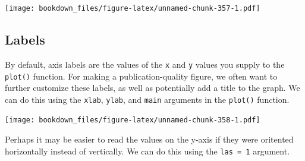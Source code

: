 \documentclass[
]{krantz}
\makeatletter
\newenvironment{Shaded}{\begin{snugshade}}{\end{snugshade}}
\newcommand{\DataTypeTok}[1]{\textcolor[rgb]{0.27,0.27,0.27}{#1}}
\newcommand{\DecValTok}[1]{\textcolor[rgb]{0.06,0.06,0.06}{#1}}
\newcommand{\KeywordTok}[1]{\textcolor[rgb]{0.27,0.27,0.27}{\textbf{#1}}}
\newcommand{\NormalTok}[1]{#1}
\newcommand{\OperatorTok}[1]{\textcolor[rgb]{0.43,0.43,0.43}{\textbf{#1}}}
\newcommand{\StringTok}[1]{\textcolor[rgb]{0.5,0.5,0.5}{#1}}
\newenvironment{kframe}{%
\medskip{}
\setlength{\fboxsep}{.8em}
 \def\at@end@of@kframe{}%
 \ifinner\ifhmode%
  \def\at@end@of@kframe{\end{minipage}}%
  \begin{minipage}{\columnwidth}%
 \fi\fi%
 \def\FrameCommand##1{\hskip\@totalleftmargin \hskip-\fboxsep
 \colorbox{shadecolor}{##1}\hskip-\fboxsep
     \hskip-\linewidth \hskip-\@totalleftmargin \hskip\columnwidth}%
 \MakeFramed {\advance\hsize-\width
   \@totalleftmargin\z@ \linewidth\hsize
   \@setminipage}}%
 {\par\unskip\endMakeFramed%
 \at@end@of@kframe}
\renewenvironment{Shaded}{\begin{kframe}}{\end{kframe}}
\makeatother
\begin{document}
\begin{Shaded}
\end{Shaded}

\texttt{[image: bookdown\_files/figure-latex/unnamed-chunk-357-1.pdf]}

\hypertarget{graphics4}{%
\subsection{Labels}\label{graphics4}}

By default, axis labels are the values of the \texttt{x} and \texttt{y} values you supply to the \texttt{plot()} function. For making a publication-quality figure, we often want to further customize these labels, as well as potentially add a title to the graph. We can do this using the \texttt{xlab}, \texttt{ylab}, and \texttt{main} arguments in the \texttt{plot()} function.

\begin{Shaded}
\end{Shaded}

\texttt{[image: bookdown\_files/figure-latex/unnamed-chunk-358-1.pdf]}

Perhaps it may be easier to read the values on the y-axis if they were oritented horizontally instead of vertically. We can do this using the \texttt{las\ =\ 1} argument.

\begin{Shaded}
\end{Shaded}
\end{document}

